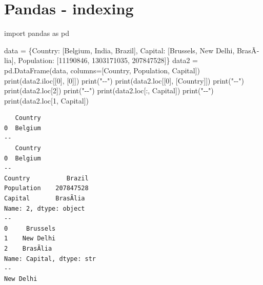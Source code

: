 \documentclass[
  english,
  letterpaper,
  DIV=11,
  numbers=noendperiod]{scrreprt}
\newenvironment{Shaded}{\begin{snugshade}}{\end{snugshade}}
\newcommand{\BuiltInTok}[1]{\textcolor[rgb]{0.00,0.23,0.31}{#1}}
\newcommand{\DecValTok}[1]{\textcolor[rgb]{0.68,0.00,0.00}{#1}}
\newcommand{\ImportTok}[1]{\textcolor[rgb]{0.00,0.46,0.62}{#1}}
\newcommand{\NormalTok}[1]{\textcolor[rgb]{0.00,0.23,0.31}{#1}}
\newcommand{\OperatorTok}[1]{\textcolor[rgb]{0.37,0.37,0.37}{#1}}
\newcommand{\StringTok}[1]{\textcolor[rgb]{0.13,0.47,0.30}{#1}}
\begin{document}
\chapter{Pandas - indexing}\label{pandas---indexing}

\begin{Shaded}
\begin{Highlighting}[]
\ImportTok{import}\NormalTok{ pandas }\ImportTok{as}\NormalTok{ pd}

\NormalTok{data }\OperatorTok{=}\NormalTok{ \{}\StringTok{\textquotesingle{}Country\textquotesingle{}}\NormalTok{: [}\StringTok{\textquotesingle{}Belgium\textquotesingle{}}\NormalTok{, }\StringTok{\textquotesingle{}India\textquotesingle{}}\NormalTok{, }\StringTok{\textquotesingle{}Brazil\textquotesingle{}}\NormalTok{],}
        \StringTok{\textquotesingle{}Capital\textquotesingle{}}\NormalTok{: [}\StringTok{\textquotesingle{}Brussels\textquotesingle{}}\NormalTok{, }\StringTok{\textquotesingle{}New Delhi\textquotesingle{}}\NormalTok{, }\StringTok{\textquotesingle{}BrasÃ­lia\textquotesingle{}}\NormalTok{],}
        \StringTok{\textquotesingle{}Population\textquotesingle{}}\NormalTok{: [}\DecValTok{11190846}\NormalTok{, }\DecValTok{1303171035}\NormalTok{, }\DecValTok{207847528}\NormalTok{]\}}
\NormalTok{data2 }\OperatorTok{=}\NormalTok{ pd.DataFrame(data, columns}\OperatorTok{=}\NormalTok{[}\StringTok{\textquotesingle{}Country\textquotesingle{}}\NormalTok{, }\StringTok{\textquotesingle{}Population\textquotesingle{}}\NormalTok{, }\StringTok{\textquotesingle{}Capital\textquotesingle{}}\NormalTok{])}
\BuiltInTok{print}\NormalTok{(data2.iloc[[}\DecValTok{0}\NormalTok{], [}\DecValTok{0}\NormalTok{]])}
\BuiltInTok{print}\NormalTok{(}\StringTok{"{-}{-}"}\NormalTok{)}
\BuiltInTok{print}\NormalTok{(data2.loc[[}\DecValTok{0}\NormalTok{], [}\StringTok{\textquotesingle{}Country\textquotesingle{}}\NormalTok{]])}
\BuiltInTok{print}\NormalTok{(}\StringTok{"{-}{-}"}\NormalTok{)}
\BuiltInTok{print}\NormalTok{(data2.loc[}\DecValTok{2}\NormalTok{])}
\BuiltInTok{print}\NormalTok{(}\StringTok{"{-}{-}"}\NormalTok{)}
\BuiltInTok{print}\NormalTok{(data2.loc[:, }\StringTok{\textquotesingle{}Capital\textquotesingle{}}\NormalTok{])}
\BuiltInTok{print}\NormalTok{(}\StringTok{"{-}{-}"}\NormalTok{)}
\BuiltInTok{print}\NormalTok{(data2.loc[}\DecValTok{1}\NormalTok{, }\StringTok{\textquotesingle{}Capital\textquotesingle{}}\NormalTok{])}
\end{Highlighting}
\end{Shaded}

\begin{verbatim}
   Country
0  Belgium
--
   Country
0  Belgium
--
Country          Brazil
Population    207847528
Capital       BrasÃ­lia
Name: 2, dtype: object
--
0     Brussels
1    New Delhi
2    BrasÃ­lia
Name: Capital, dtype: str
--
New Delhi
\end{verbatim}
\end{document}
